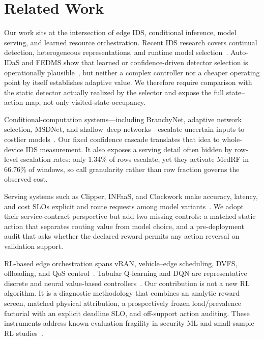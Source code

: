\section{Related Work}
\label{sec:relwork}
Our work sits at the intersection of edge IDS, conditional inference, model serving, and learned resource orchestration. Recent IDS research covers continual detection, heterogeneous representations, and runtime model selection~\cite{Wang2024BFSNID,AOCIDS2024,StatAvg2025,DMIDS2025}. Auto-IDaS and FEDMS show that learned or confidence-driven detector selection is operationally plausible~\cite{Lin2024AutoIDaS,Hasan2026FEDMS}, but neither a complex controller nor a cheaper operating point by itself establishes adaptive value. We therefore require comparison with the static detector actually realized by the selector and expose the full state--action map, not only visited-state occupancy.

Conditional-computation systems---including BranchyNet, adaptive network selection, MSDNet, and shallow--deep networks---escalate uncertain inputs to costlier models~\cite{Teerapittayanon2016BranchyNet,Bolukbasi2017Adaptive,Huang2018MSDNet,Kaya2019ShallowDeep}. Our fixed confidence cascade translates that idea to whole-device IDS measurement. It also exposes a serving detail often hidden by row-level escalation rates: only 1.34\% of rows escalate, yet they activate MedRF in 66.76\% of windows, so call granularity rather than row fraction governs the observed cost.

Serving systems such as Clipper, INFaaS, and Clockwork make accuracy, latency, and cost SLOs explicit and route requests among model variants~\cite{Crankshaw2017Clipper,Romero2021INFaaS,Gujarati2020Clockwork}. We adopt their service-contract perspective but add two missing controls: a matched static action that separates routing value from model choice, and a pre-deployment audit that asks whether the declared reward permits any action reversal on validation support.

RL-based edge orchestration spans vRAN, vehicle--edge scheduling, DVFS, offloading, and QoS control~\cite{Murti2024vRAN,Zhang2024VehicleEdge,Zhang2024DVFO,Lou2024Startup,Kim2024DistributedOffload,Maleki2024QCS,Nan2026RobustDNN,Wang2025TrustOffload,Hu2025SITOff}. Tabular Q-learning and DQN are representative discrete and neural value-based controllers~\cite{Watkins1992,Mnih2015}. Our contribution is not a new RL algorithm. It is a diagnostic methodology that combines an analytic reward screen, matched physical attribution, a prospectively frozen load/prevalence factorial with an explicit deadline SLO, and off-support action auditing. These instruments address known evaluation fragility in security ML and small-sample RL studies~\cite{Arp2022,Agarwal2021}.
